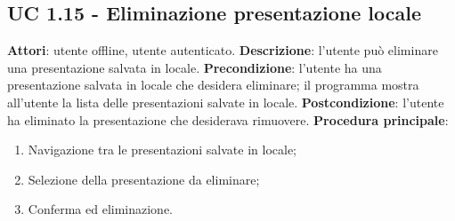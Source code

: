 \subsection{UC 1.15 - Eliminazione presentazione locale}{
	\label{uc1.15}
	\textbf{Attori}: utente offline, utente autenticato.
	\textbf{Descrizione}: l'utente può eliminare una presentazione salvata in locale.
	\textbf{Precondizione}: l'utente ha una presentazione salvata in locale che desidera eliminare; il programma mostra all'utente la lista delle presentazioni salvate in locale.
	\textbf{Postcondizione}: l'utente ha eliminato la presentazione che desiderava rimuovere.
	\textbf{Procedura principale}:
	\begin{enumerate}
		\item Navigazione tra le presentazioni salvate in locale;
		\item Selezione della presentazione da eliminare;
		\item Conferma ed eliminazione.
	\end{enumerate}
}